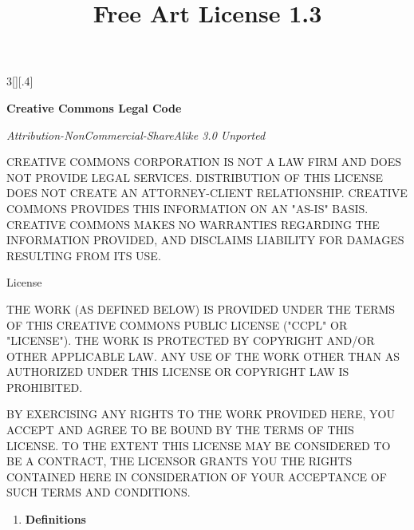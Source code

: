 \documentclass[8pt,a4paper]{article}
\title{Free Art License 1.3}
\begin{document}
%

\begin{multicols}{3}[][.4\paperwidth]%
 {%

  \textbf{Creative Commons Legal Code}
  \smallskip 

  \emph{Attribution-NonCommercial-ShareAlike 3.0 Unported}
  \smallskip

  CREATIVE COMMONS CORPORATION IS NOT A LAW FIRM AND DOES NOT PROVIDE
  LEGAL SERVICES. DISTRIBUTION OF THIS LICENSE DOES NOT CREATE AN
  ATTORNEY-CLIENT RELATIONSHIP. CREATIVE COMMONS PROVIDES THIS
  INFORMATION ON AN "AS-IS" BASIS. CREATIVE COMMONS MAKES NO WARRANTIES
  REGARDING THE INFORMATION PROVIDED, AND DISCLAIMS LIABILITY FOR
  DAMAGES RESULTING FROM ITS USE.
  

 \medskip
  License
  \smallskip

  THE WORK (AS DEFINED BELOW) IS PROVIDED UNDER THE TERMS OF THIS CREATIVE
  COMMONS PUBLIC LICENSE ("CCPL" OR "LICENSE"). THE WORK IS PROTECTED BY
  COPYRIGHT AND/OR OTHER APPLICABLE LAW. ANY USE OF THE WORK OTHER THAN AS
  AUTHORIZED UNDER THIS LICENSE OR COPYRIGHT LAW IS PROHIBITED.
  
  BY EXERCISING ANY RIGHTS TO THE WORK PROVIDED HERE, YOU ACCEPT AND AGREE
  TO BE BOUND BY THE TERMS OF THIS LICENSE. TO THE EXTENT THIS LICENSE MAY
  BE CONSIDERED TO BE A CONTRACT, THE LICENSOR GRANTS YOU THE RIGHTS
  CONTAINED HERE IN CONSIDERATION OF YOUR ACCEPTANCE OF SUCH TERMS AND
  CONDITIONS.

}

\bigskip
\begin{enumerate}  
  \item \textbf{Definitions}

  \begin{enumerate}


\end{enumerate}
\end{enumerate}
\end{multicols}
\end{document}
